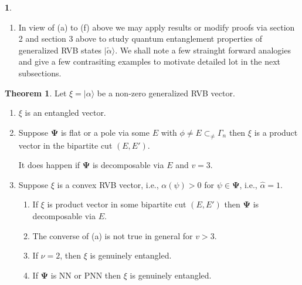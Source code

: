 \documentclass[a4paper,12pt]{article}
\theoremstyle{definition}
\theoremstyle{underlinethm}
\newtheorem{thm}{Theorem}[section]
\theoremstyle{definition}
\newtheorem{subsubsec}{}[subsection]
\begin{document}
\begin{subsubsec}
\begin{enumerate}[label=(\alph*)]
\item In view of (a) to (f) above we may apply results or modify proofs via section 2 and section 3 above to study quantum entanglement properties of generalized RVB states $| \tilde{\alpha} \rangle$. We shall note a few strainght forward analogies and give a few contrasiting examples to motivate detailed lot in the next subsections.
	
\end{enumerate}

\end{subsubsec}

\begin{thm}\label{thm-4.1}
Let $\xi = | \alpha \rangle$ be a non-zero generalized RVB vector.
\begin{enumerate}[label= (\roman*)]
\item $\xi$ is an entangled vector.

\item Suppose $\boldsymbol{\Psi}$ is flat or a pole via some $E$ with $\phi \neq E \subset_{\neq} \Gamma_{n}$ then $\xi$ is a product vector in  the bipartite cut $(E, E')$.

It does happen if $\boldsymbol{\Psi}$ is decomposable via $E$ and $v=3$.

\item Suppose $\xi$ is a convex RVB vector, i.e., $\alpha(\psi) > 0$ for $\psi \in \boldsymbol{\Psi}$, i.e., $\hat{\alpha}=1$. 
\begin{enumerate}[label=(\alph*)]
\item If $\xi$ is product vector in some bipartite cut $(E, E')$ then $\boldsymbol{\Psi}$ is decomposable via $E$.

\item The converse of (a) is not true in general for $v > 3$.

\item If $\nu = 2$, then $\xi$ is genuinely entangled.

\item If $\boldsymbol{\Psi}$ is NN or PNN then $\xi$ is genuinely entangled.
\end{enumerate}

 \end{enumerate}

\end{thm}
\end{document}
